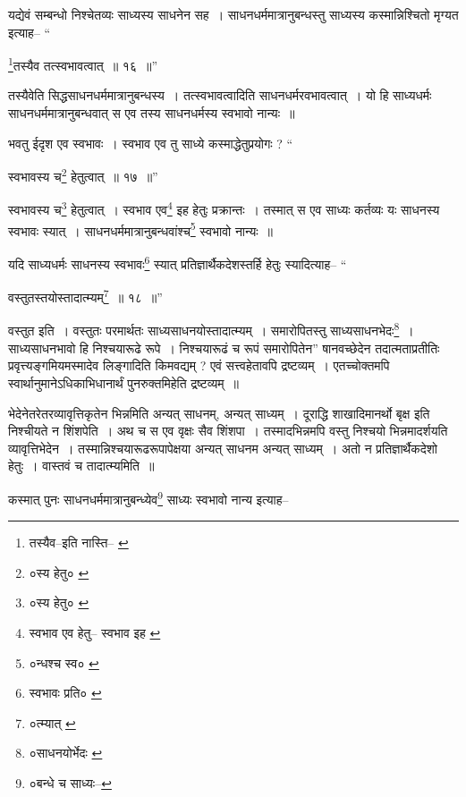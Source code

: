 \documentclass[article,12pt,a4paper]{memoir}
\begin{document}
	यद्येवं सम्बन्धो निश्चेतव्यः साध्यस्य साधनेन सह । साधनधर्ममात्रानुबन्धस्तु साध्यस्य कस्मान्निश्चितो मृग्यत इत्याह-- “
	  
	\footnote{तस्यैव--इति नास्ति--\cite{dp-edP} \cite{dp-edH}}\-तस्यैव तत्स्वभावत्वात् ॥ १६ ॥” 
	  
	तस्यैवेति सिद्धसाधनधर्ममात्रानुबन्धस्य । तत्स्वभावत्वादिति साधनधर्मरवभावत्वात् । यो हि साध्यधर्मः साधनधर्ममात्रानुबन्धवात् स एव तस्य साधनधर्मस्य स्वभावो नान्यः ॥ 
	  
	भवतु ईदृश एव स्वभावः । स्वभाव एव तु साध्ये कस्माद्धेतुप्रयोगः ? “
	  
	स्वभावस्य च\footnote{०स्य हेतु० \cite{dp-msC}} हेतुत्वात् ॥ १७ ॥” 
	  
	स्वभावस्य च\footnote{०स्य हेतु० \cite{dp-msC}} हेतुत्वात् । स्वभाव एव\footnote{स्वभाव एव हेतु--\cite{dp-msB} स्वभाव इह \cite{dp-msA} \cite{dp-edP} \cite{dp-edH} \cite{dp-edN}} इह हेतुः प्रक्रान्तः । तस्मात् स एव साध्यः कर्तव्यः यः साधनस्य स्वभावः स्यात् । साधनधर्ममात्रानुबन्धवांश्च\footnote{०न्धश्च स्व० \cite{dp-msA} \cite{dp-edP} \cite{dp-edE} \cite{dp-edH} \cite{dp-edN}} स्वभावो नान्यः ॥ 
	  
	यदि साध्यधर्मः साधनस्य स्वभावः\footnote{स्वभावः प्रति० \cite{dp-msA} \cite{dp-msB} \cite{dp-msD} \cite{dp-edP} \cite{dp-edE} \cite{dp-edH} \cite{dp-edN}} स्यात् प्रतिज्ञार्थैकदेशस्तर्हि हेतुः स्यादित्याह-- “
	  
	वस्तुतस्तयोस्तादात्म्यम्\footnote{०त्म्यात् \cite{dp-msB} \cite{dp-msD} \cite{dp-edP} \cite{dp-edH} \cite{dp-edE} \cite{dp-edN}} ॥ १८ ॥” 
	  
	वस्तुत इति । वस्तुतः परमार्थतः साध्यसाधनयोस्तादात्म्यम् । समारोपितस्तु साध्यसाधनभेदः\footnote{०साधनयोर्भेदः \cite{dp-msA} \cite{dp-edP} \cite{dp-edH} \cite{dp-edE} \cite{dp-edN}} । साध्यसाधनभावो हि निश्चयारूढे रूपे । निश्चयारूढं च रूपं समारोपितेन” षानवच्छेदेन तदात्मताप्रतीतिः प्रवृत्त्यङ्गमियमस्मादेव लिङ्गादिति किमवद्यम् ? एवं सत्त्वहेतावपि द्रष्टव्यम् । एतच्चोक्तमपि स्वार्थानुमानेऽधिकाभिधानार्थं पुनरुक्तमिहेति द्रष्टव्यम् ॥
	\pend
	  \bigskip
	  \begingroup
	

	  \pstart भेदेनेतरेतरव्यावृत्तिकृतेन भिन्नमिति अन्यत् साधनम्, अन्यत् साध्यम् । दूराद्धि शाखादिमानर्थो बृक्ष इति निश्चीयते न शिंशपेति । अथ च स एव वृक्षः सैव शिंशपा । तस्मादभिन्नमपि वस्तु निश्चयो भिन्नमादर्शयति व्यावृत्तिभेदेन । तस्मान्निश्चयारूढरूपापेक्षया अन्यत् साधनम अन्यत् साध्यम् । अतो न प्रतिज्ञार्थैकदेशो हेतुः । वास्तवं च तादात्म्यमिति ॥
	\pend
       

	  \pstart कस्मात् पुनः साधनधर्ममात्रानुबन्ध्येव\footnote{०बन्धे च साध्यः--\cite{dp-msB}} साध्यः स्वभावो नान्य इत्याह--
	\pend
       
\end{document}
